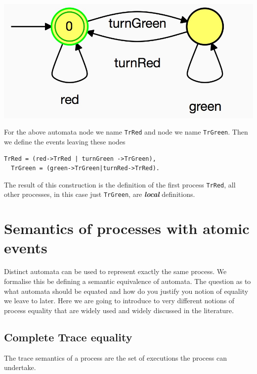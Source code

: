 \documentclass[]{article}
\begin{document}
\noindent\begin{center} \includegraphics[scale=0.15]{TrRed.jpg} \end{center}

For the above automata node {} we name \verb$TrRed$ and  node {} we name \verb$TrGreen$. Then we define the events leaving these nodes
\begin{center}\begin{minipage}{0.5\textwidth}
\begin{verbatim}
TrRed = (red->TrRed | turnGreen ->TrGreen),
  TrGreen = (green->TrGreen|turnRed->TrRed).
\end{verbatim} 
\end{minipage}\end{center}

  The result of this construction is the definition of the first process \verb$TrRed$, all other processes, in this case just  \verb$TrGreen$, are  {\bf \it local} definitions.

\section{Semantics of processes with atomic events}
 Distinct automata can be used to  represent exactly the same process. We formalise this be defining a semantic equivalence  of automata.  The question as to what automata should be equated and how do you justify you notion of equality we leave to later. Here we are going to introduce to very different notions of process equality that are widely used and widely discussed in the literature. 
 
 
 
 
 \subsection{Complete Trace equality}\label{sec:Trc}
 The trace semantics of a process are the set of executions the process can undertake.
 
\end{document}
